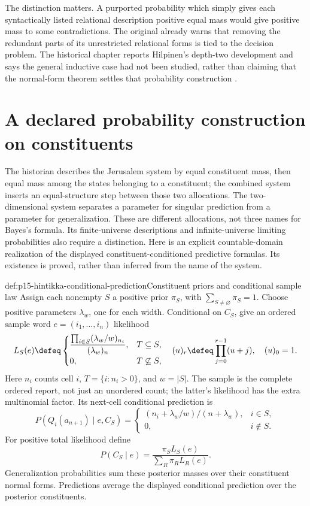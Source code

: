 The distinction matters. A purported probability which simply gives
each syntactically listed relational description positive equal mass
would give positive mass to some contradictions. The original already
warns that removing the redundant parts of its unrestricted relational
forms is tied to the decision problem. The historical chapter reports
Hilpinen's depth-two development and says the general inductive case had
not been studied, rather than claiming that the normal-form theorem
settles that probability construction
\cite[introduction, pp.~7--9]{Hintikka1953DistributiveNormalForms}
\cite[pp.~326--329]{Niiniluoto2011HintikkaProgramReading}.

\section{A declared probability construction on constituents}
\label{sec:p15-hintikka-probability-construction}

The historian describes the Jerusalem system by equal constituent mass,
then equal mass among the states belonging to a constituent; the combined
system inserts an equal-structure step between those two allocations.
The two-dimensional system separates a parameter for singular prediction
from a parameter for generalization. These are different allocations,
not three names for Bayes's formula. Its finite-universe descriptions
and infinite-universe limiting probabilities also require a distinction.
Here is an explicit countable-domain realization of the displayed
constituent-conditioned predictive formulas. Its existence is proved,
rather than inferred from the name of the system.

\begin{hbdefinition}{def:p15-hintikka-conditional-prediction}{Constituent priors and conditional sample law}
Assign each nonempty \(S\) a positive prior \(\pi_S\), with
\(\sum_{S\ne\varnothing}\pi_S=1\). Choose positive parameters
\(\lambda_w\), one for each width. Conditional on \(C_S\),
give an ordered sample word \(e=(i_1,\ldots,i_n)\) likelihood
\[
 L_S(e)\defeq
 \begin{cases}
 \displaystyle\frac{\prod_{i\in S}(\lambda_w/w)_{n_i}}
                       {(\lambda_w)_n},&T\subseteq S,\\
 0,&T\not\subseteq S,
 \end{cases}
 \quad
 (u)_r\defeq\prod_{j=0}^{r-1}(u+j),\quad (u)_0=1.
\]
Here \(n_i\) counts cell \(i\), \(T=\{i:n_i>0\}\), and
\(w=|S|\). The sample is the complete ordered report, not just
an unordered count; the latter's likelihood has the extra multinomial
factor. Its next-cell conditional prediction is
\[
 P(Q_i(a_{n+1})\mid e,C_S)=
 \begin{cases}(n_i+\lambda_w/w)/(n+\lambda_w),&i\in S,\\
 0,&i\notin S.
 \end{cases}
\]
For positive total likelihood define
\[
 P(C_S\mid e)=\frac{\pi_SL_S(e)}{\sum_R\pi_RL_R(e)}.
\]
Generalization probabilities sum these posterior masses over their
constituent normal forms. Predictions average the displayed conditional
prediction over the posterior constituents.
\end{hbdefinition}

